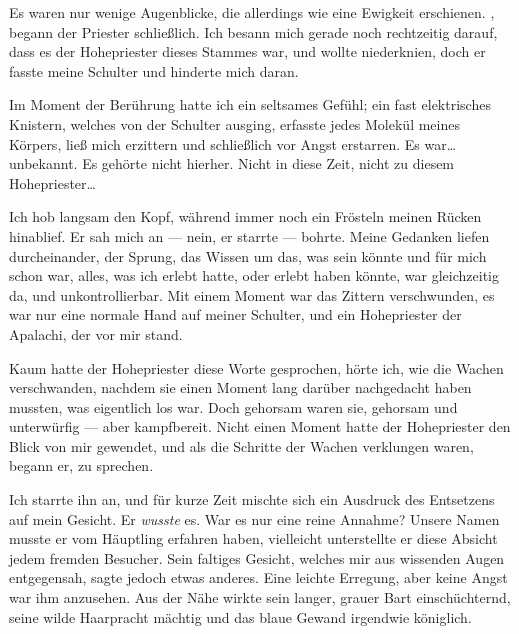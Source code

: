 Es waren nur wenige Augenblicke, die allerdings wie eine Ewigkeit erschienen. 
, begann der Priester schließlich. Ich besann mich gerade noch rechtzeitig darauf, dass es der Hohepriester dieses Stammes war, und wollte niederknien, doch er fasste meine Schulter und hinderte mich daran.

Im Moment der Berührung hatte ich ein seltsames Gefühl; ein fast elektrisches Knistern, welches von der Schulter ausging, erfasste jedes Molekül meines Körpers, ließ mich erzittern und schließlich vor Angst erstarren. Es war\dots{} unbekannt. Es gehörte nicht hierher. Nicht in diese Zeit, nicht zu diesem Hohepriester\dots{}

Ich hob langsam den Kopf, während immer noch ein Frösteln meinen Rücken hinablief. Er sah mich an --- nein, er starrte --- bohrte. Meine Gedanken liefen durcheinander, der Sprung, das Wissen um das, was sein könnte und für mich schon war, alles, was ich erlebt hatte, oder erlebt haben könnte, war gleichzeitig da, und unkontrollierbar.
Mit einem Moment war das Zittern verschwunden, es war nur eine normale Hand auf meiner Schulter, und ein Hohepriester der Apalachi, der vor mir stand.

 Kaum hatte der Hohepriester diese Worte gesprochen, hörte ich, wie die Wachen verschwanden, nachdem sie einen Moment lang darüber nachgedacht haben mussten, was eigentlich los war. Doch gehorsam waren sie, gehorsam und unterwürfig --- aber kampfbereit. 
Nicht einen Moment hatte der Hohepriester den Blick von mir gewendet, und als die Schritte der Wachen verklungen waren, begann er, zu sprechen.

Ich starrte ihn an, und für kurze Zeit mischte sich ein Ausdruck des Entsetzens auf mein Gesicht. Er \emph{wusste} es. War es nur eine reine Annahme? Unsere Namen musste er vom Häuptling erfahren haben, vielleicht unterstellte er diese Absicht jedem fremden Besucher. Sein faltiges Gesicht, welches mir aus wissenden Augen entgegensah, sagte jedoch etwas anderes. Eine leichte Erregung, aber keine Angst war ihm anzusehen. Aus der Nähe wirkte sein langer, grauer Bart einschüchternd, seine wilde Haarpracht mächtig und das blaue Gewand irgendwie königlich.


